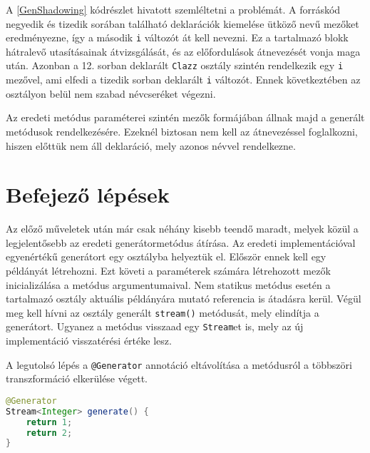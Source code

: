 A \ref{GenShadowing} kódrészlet hivatott szemléltetni a problémát. A forráskód negyedik és tizedik sorában található deklarációk kiemelése ütköző nevű mezőket eredményezne, így a második \texttt{i} változót át kell nevezni. Ez a tartalmazó blokk hátralevő utasításainak átvizsgálását, és az előfordulások átnevezését vonja maga után. Azonban a 12. sorban deklarált \texttt{Clazz} osztály szintén rendelkezik egy \texttt{i} mezővel, ami elfedi a tizedik sorban deklarált \texttt{i} változót. Ennek következtében az osztályon belül nem szabad névcseréket végezni. 

Az eredeti metódus paraméterei szintén mezők formájában állnak majd a generált metódusok rendelkezésére. Ezeknél biztosan nem kell az átnevezéssel foglalkozni, hiszen előttük nem áll deklaráció, mely azonos névvel rendelkezne.

\section{Befejező lépések}

Az előző műveletek után már csak néhány kisebb teendő maradt, melyek közül a legjelentősebb az eredeti generátormetódus átírása. Az eredeti implementációval egyenértékű generátort egy osztályba helyeztük el. Először ennek kell egy példányát létrehozni. Ezt követi a paraméterek számára létrehozott mezők inicializálása a metódus argumentumaival. Nem statikus metódus esetén a tartalmazó osztály aktuális példányára mutató referencia is átadásra kerül. Végül meg kell hívni az osztály generált \texttt{stream()} metódusát, mely elindítja a generátort. Ugyanez a metódus visszaad egy \texttt{Stream}et is, mely az új implementáció visszatérési értéke lesz.

A legutolsó lépés a \texttt{@Generator} annotáció eltávolítása a metódusról a többszöri transzformáció elkerülése végett.

\begin{lstlisting}[language=Java, caption={Az $1, 2$ sorozatot előállító generátor a transzformáció előtt}, captionpos=b, label=GenBefore, escapechar=$]
@Generator
Stream<Integer> generate() {
    return 1;
    return 2;
}
\end{lstlisting}

